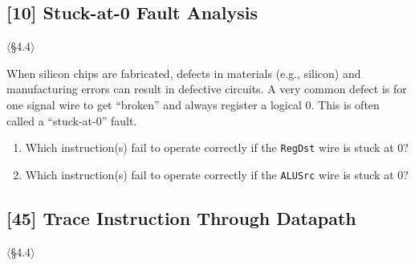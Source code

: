 \subsection{[10] Stuck-at-0 Fault Analysis}
\hypertarget{prob-4.4}{}
\noindent$\langle$\S4.4$\rangle$\medskip

\noindent When silicon chips are fabricated, defects in materials (e.g.,
silicon) and manufacturing errors can result in defective circuits. A very
common defect is for one signal wire to get ``broken'' and always register a
logical 0. This is often called a ``stuck-at-0'' fault.

\begin{enumerate}
  \item[4.4.1] [5] Which instruction(s) fail to operate correctly if the
        \texttt{RegDst} wire is stuck at 0?
  \item[4.4.2] [5] Which instruction(s) fail to operate correctly if the
        \texttt{ALUSrc} wire is stuck at 0?
\end{enumerate}

\problembreak

\subsection{[45] Trace Instruction Through Datapath}
\hypertarget{prob-4.5}{}
\noindent$\langle$\S4.4$\rangle$\medskip

